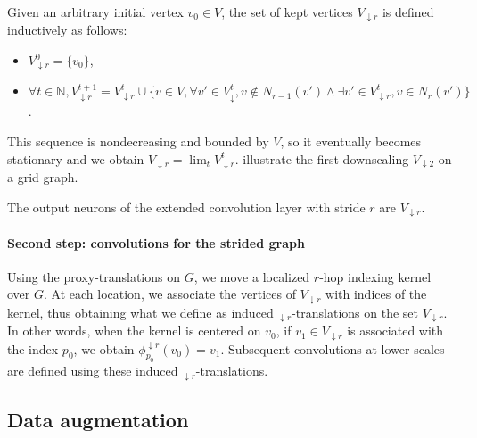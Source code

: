 Given an arbitrary initial vertex $v_0 \in V$, the set of kept vertices $V_{\downarrow r}$ is defined inductively as follows:
\begin{itemize}[noitemsep,nolistsep]
\item $V_{\downarrow r}^0 = \{v_0\}$,
\item $\forall t \in \mathbb{N}, V_{\downarrow r}^{t+1} = V_{\downarrow r}^t \cup \{v \in V, \forall v' \in V_{\downarrow }^t, v \not\in N_{r-1}(v') \land \exists v' \in V_{\downarrow r}^t, v \in N_{r}(v') \}$.
\end{itemize}

This sequence is nondecreasing and bounded by $V$, so it eventually becomes stationary and we obtain $V_{\downarrow r} = \lim_t{V_{\downarrow r}^t}$.  illustrate the first downscaling $V_{\downarrow 2}$ on a grid graph. %

The output neurons of the extended convolution layer with stride $r$ are $V_{\downarrow r}$.

\paragraph{Second step: convolutions for the strided graph}

Using the proxy-translations on $G$, we move a localized $r$-hop indexing kernel over $G$. At each location, we associate the vertices of $V_{\downarrow r}$ with indices of the kernel, thus obtaining what we define as induced $_{\downarrow r}$-translations on the set $V_{\downarrow r}$. In other words, when the kernel is centered on $v_0$, if $v_1 \in V_{\downarrow r}$ is associated with the index $p_0$, we obtain $\phi_{p_0}^{\downarrow r}(v_0) = v_1$. Subsequent convolutions at lower scales are defined using these induced $_{\downarrow r}$-translations.




\subsection{Data augmentation}

